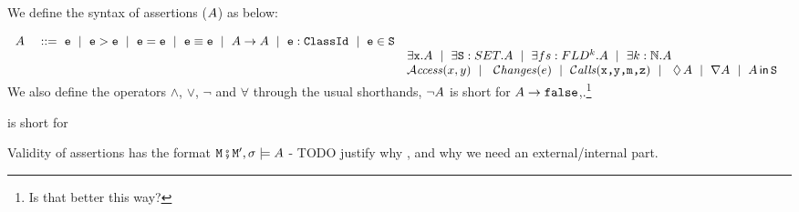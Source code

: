 \begin{definition}[Assertions]We define the syntax of assertions ($A$) as below:
\label{def:assertions}

$\begin{array}{lcl}
\A &\ ::=\    \SE  \ \mid \ \SE > \SE \ \mid \  \SE=\SE  \ \mid \ \SE \equiv \SE \ \mid  \ \A \rightarrow \A \ \mid \   \SE:\prg{ClassId}  \ \mid \   
    \SE\in\prg{S}  \\
 & &   \exists \x.\A  \ \mid \  \exists \prg{S}:SET.\A  \ \mid \  \exists fs:FLD^k.\A
 \ \mid \  \exists k:\mathbb{N}.\A  
\\
 & &    \CanAccess x y \ \mid\  \ \Changes e \ \mid\  \Calls{\prg{x},\prg{y},\prg{m},\prg{z}} \ \mid\  \  \Future \A  \ \mid \  \Past \A \ \mid \ \Using \A \prg{S }
\end{array}$
We also define the operators $\wedge$, $\vee$,  $\neg$ and $\forall$  through the usual shorthands, \ie $\neg A$ is short for 
$A \rightarrow {\mbox{\tt{false}}}$,\etc.\footnote{Is that better this way?}

 is short for 

\end{definition} 

Validity of assertions has the format ${\mbox{\tt{\ensuremath{{\mbox{\tt{M}}}}}}}\fatsemi {\mbox{\tt{\ensuremath{{\mbox{\tt{M}}}}}}}', \sigma \models A$ - TODO justify why \M, and why we need an external/internal part.

